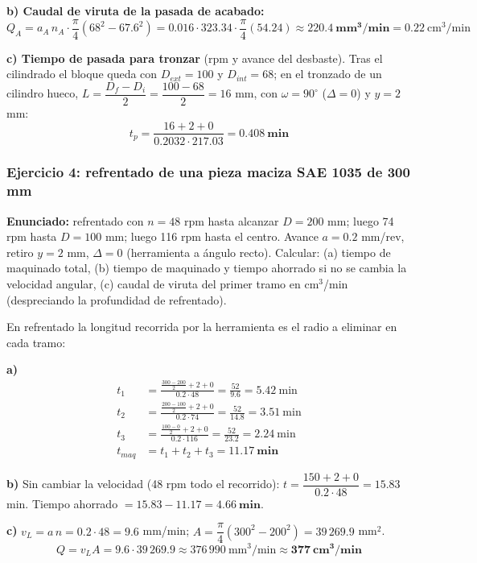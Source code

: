 \documentclass[12pt,a4paper]{article}
\begin{document}
\textbf{b) Caudal de viruta de la pasada de acabado:}
\[ Q_A = a_A\, n_A\cdot\frac{\pi}{4}(68^2 - 67.6^2) = 0.016\cdot
	323.34\cdot\frac{\pi}{4}(54.24) \approx \mathbf{220.4\ mm^3/min} = 0.22\
	\text{cm}^3/\text{min} \]

\textbf{c) Tiempo de pasada para tronzar} (rpm y avance del desbaste). Tras el
cilindrado el bloque queda con $D_{ext} = 100$ y $D_{int} = 68$; en el tronzado
de un cilindro hueco, $L = \dfrac{D_f - D_i}{2} = \dfrac{100-68}{2} = 16$ mm,
con $\omega = 90^\circ$ ($\Delta = 0$) y $y = 2$ mm:
\[ t_p = \frac{16 + 2 + 0}{0.2032\cdot 217.03} = \mathbf{0.408\ min} \]

\subsubsection*{Ejercicio 4: refrentado de una pieza maciza SAE 1035 de 300 mm}
\textbf{Enunciado:} refrentado con $n = 48$ rpm hasta alcanzar $D = 200$ mm;
luego 74 rpm hasta $D = 100$ mm; luego 116 rpm hasta el centro. Avance $a = 0.2$
mm/rev, retiro $y = 2$ mm, $\Delta = 0$ (herramienta a ángulo recto). Calcular:
(a) tiempo de maquinado total, (b) tiempo de maquinado y tiempo ahorrado si no
se cambia la velocidad angular, (c) caudal de viruta del primer tramo en
cm$^3$/min (despreciando la profundidad de refrentado).

En refrentado la longitud recorrida por la herramienta es el radio a eliminar en
cada tramo:

\textbf{a)}
\begin{align*}
	t_1     & = \frac{\frac{300-200}{2} + 2 + 0}{0.2\cdot 48} = \frac{52}{9.6} =
	5.42\
	\text{min}
	\\
	t_2     & = \frac{\frac{200-100}{2} + 2 + 0}{0.2\cdot 74} = \frac{52}{14.8} =
	3.51\
	\text{min}
	\\
	t_3     & = \frac{\frac{100-0}{2} + 2 + 0}{0.2\cdot 116} = \frac{52}{23.2} =
	2.24\ \text{min}
	\\
	t_{maq} & = t_1 + t_2 + t_3 = \mathbf{11.17\ min}
\end{align*}

\textbf{b)} Sin cambiar la velocidad (48 rpm todo el recorrido): $t = \dfrac{150
		+ 2 + 0}{0.2\cdot 48} = 15.83$ min. Tiempo ahorrado $= 15.83 - 11.17 =
	\mathbf{4.66\ min}$.

\textbf{c)} $v_L = a\,n = 0.2\cdot 48 = 9.6$ mm/min; $A = \dfrac{\pi}{4}(300^2 -
	200^2) = 39\,269.9$ mm$^2$.
\[ Q = v_L A = 9.6\cdot 39\,269.9 \approx 376\,990\ \text{mm}^3/\text{min}
	\approx \mathbf{377\ cm^3/min} \]
\end{document}
